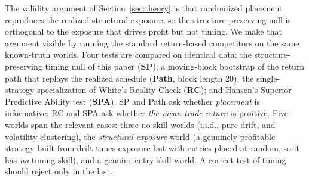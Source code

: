\documentclass[risks,article,submit,pdftex,oneauthor]{Definitions/mdpi}
\begin{document}
The validity argument of Section~\ref{sec:theory} is that randomized placement reproduces the realized structural exposure, so the structure-preserving null is orthogonal to the exposure that drives profit but not timing. We make that argument visible by running the standard return-based competitors on the same known-truth worlds. Four tests are compared on identical data: the structure-preserving timing null of this paper (\textbf{SP}); a moving-block bootstrap of the return path that replays the realized schedule (\textbf{Path}, block length $20$); the single-strategy specialization of White's Reality Check \citep{white2000} (\textbf{RC}); and Hansen's Superior Predictive Ability test \citep{hansen2005} (\textbf{SPA}). SP and Path ask whether \emph{placement} is informative; RC and SPA ask whether \emph{the mean trade return} is positive. Five worlds span the relevant cases: three no-skill worlds (i.i.d., pure drift, and volatility clustering), the \emph{structural-exposure} world (a genuinely profitable strategy built from drift times exposure but with entries placed at random, so it has \emph{no} timing skill), and a genuine entry-skill world. A correct test of timing should reject only in the last.
\end{document}
